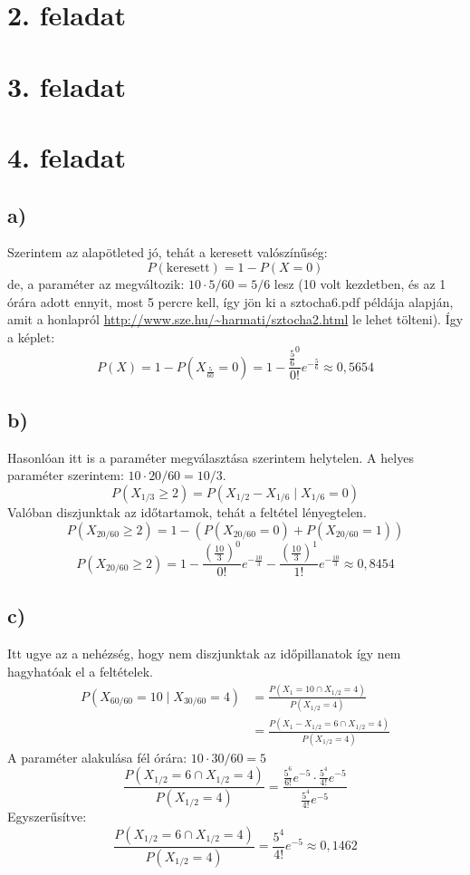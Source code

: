 \documentclass[a4paper,12pt]{article}   		%
\begin{document}
\section*{2. feladat}
\section*{3. feladat}
\section*{4. feladat}
\subsection*{a)}
Szerintem az alapötleted jó, tehát a keresett valószínűség:
\[P(\text{keresett}) = 1 - P(X = 0)\]
de, a paraméter az megváltozik: $10 \cdot 5/60 = 5/6$ lesz (10 volt kezdetben, 
és az 1 órára adott ennyit, most 5 percre kell, így jön ki a
\mbox{sztocha6.pdf} példája alapján, amit a honlapról 
\url{http://www.sze.hu/~harmati/sztocha2.html} le lehet tölteni). 
Így a képlet:
\[P(X) = 1 - P(X_\frac{5}{60} = 0) = 1 - \frac{\frac{5}{6}^0}{0!}
e^{-\frac{5}{6}} \approx 0,5654\]

\subsection*{b)}
Hasonlóan itt is a paraméter megválasztása szerintem helytelen. A helyes 
paraméter szerintem: $10 \cdot 20/60 = 10/3$.
\[P(X_{1/3} \geq 2) = P(X_{1/2}-X_{1/6} \mid X_{1/6}=0)\]
Valóban diszjunktak az időtartamok, tehát a feltétel lényegtelen.
\[
P(X_{20/60} \geq 2) = 1 - \left( P(X_{20/60} = 0)+P(X_{20/60} = 1)\right)
\]
\[
P(X_{20/60} \geq 2) = 1 - \frac{\left(\frac{10}{3}\right)^0}{0!}e^
{-\frac{10}{3}} - \frac{\left(\frac{10}{3}\right)^1}{1!}e^{-\frac{10}{3}} 
\approx 0,8454
\]

\subsection*{c)}
Itt ugye az a nehézség, hogy nem diszjunktak az időpillanatok így nem
hagyhatóak el a feltételek.
\begin{equation*}
\begin{split}
P(X_{60/60} = 10 \mid X_{30/60} = 4) &= \frac{P(X_1 = 10 \cap X_{1/2} = 4)}
{P(X_{1/2} = 4)} \\
&= \frac{P(X_1-X_{1/2} = 6 \cap X_{1/2} = 4)}{P(X_{1/2} = 4)}
\end{split}
\end{equation*}
A paraméter alakulása fél órára: $10 \cdot 30/60 = 5$
\[
\frac{P(X_{1/2} = 6 \cap X_{1/2} = 4)}{P(X_{1/2} = 4)} = \frac{\frac{5^6}{6!}
e^{-5} \cdot \frac{5^4}{4!} e^{-5}}{\frac{5^4}{4!} e^{-5}}
\]
Egyszerűsítve:
\[
\frac{P(X_{1/2} = 6 \cap X_{1/2} = 4)}{P(X_{1/2} = 4)} = 
\frac{5^4}{4!} e^{-5} \approx 0,1462
\]
\end{document}
